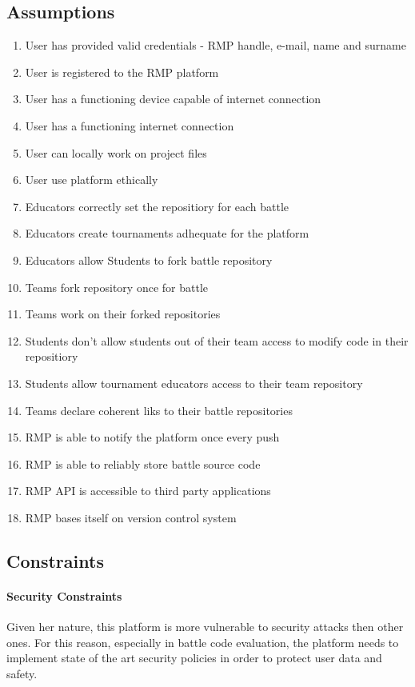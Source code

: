 \subsection{Assumptions}
\begin{enumerate}[label=$\bullet$ \textbf{D\arabic*:}]
    \item User has provided valid credentials - RMP handle, e-mail, name and surname
    \item User is registered to the RMP platform
    \item User has a functioning device capable of internet connection
    \item User has a functioning internet connection
    \item User can locally work on project files
    \item User use platform ethically
    \item Educators correctly set the repositiory for each battle
    \item Educators create tournaments adhequate for the platform
    \item Educators allow Students to fork battle repository
    \item Teams fork repository once for battle
    \item Teams work on their forked repositories
    \item Students don't allow students out of their team access to modify code in their repositiory
    \item Students allow tournament educators access to their team repository
    \item Teams declare coherent liks to their battle repositories
    \item RMP is able to notify the platform once every push
    \item RMP is able to reliably store battle source code
    \item RMP API is accessible to third party applications
    \item RMP bases itself on version control system
\end{enumerate}
\subsection{Constraints}
\paragraph{Security Constraints}
Given her nature, this platform is more vulnerable to security attacks then other ones. For this reason, especially in battle code evaluation, the platform needs to implement state of the art security policies in order to protect user data and safety.
